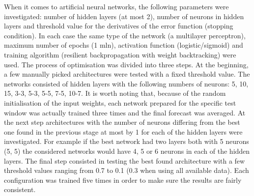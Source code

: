 When it comes to artificial neural networks, the following parameters were investigated: number of hidden layers (at most 2), number of neurons in hidden layers and threshold value for the derivatives of the error function (stopping condition). In each case the same type of the network (a multilayer perceptron), maximum number of epochs (1 mln), activation function (logistic/sigmoid) and training algorithm (resilient backpropagation with weight backtracking) were used. The process of optimisation was divided into three steps. At the beginning, a few manually picked architectures were tested with a fixed threshold value. The networks consisted of hidden layers with the following numbers of neurons: 5, 10, 15, 3-3, 5-3, 5-5, 7-5, 10-7. It is worth noting that, because of the random initialisation of the input weights, each network prepared for the specific test window was actually trained three times and the final forecast was averaged. At the next step architectures with the number of neurons differing from the best one found in the previous stage at most by 1 for each of the hidden layers were investigated. For example if the best network had two layers both with 5 neurons (5, 5) the considered networks would have 4, 5 or 6 neurons in each of the hidden layers. The final step consisted in testing the best found architecture with a few threshold values ranging from 0.7 to 0.1 (0.3 when using all available data). Each configuration was trained five times in order to make sure the results are fairly consistent.

